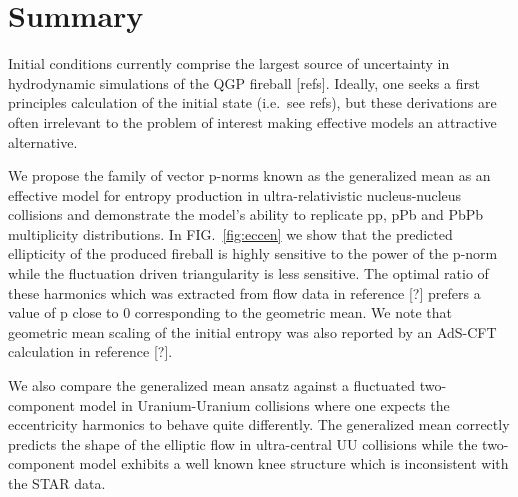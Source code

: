 \documentclass[aps,prl,reprint,amsmath,nofootinbib]{revtex4-1}
\begin{document}
\section{Summary}

Initial conditions currently comprise the largest source of uncertainty in hydrodynamic simulations of the QGP
fireball [refs]. Ideally, one seeks a first principles calculation of the initial state (i.e.\ see refs), but
these derivations are often irrelevant to the problem of interest making effective models an attractive
alternative.

We propose the family of vector p-norms known as the generalized mean as an effective model for entropy
production in ultra-relativistic nucleus-nucleus collisions and demonstrate the model's ability to
replicate pp, pPb and PbPb multiplicity distributions. In FIG.~\ref{fig:eccen} we show that the predicted
ellipticity of the produced fireball is highly sensitive to the power of the p-norm while the fluctuation
driven triangularity is less sensitive. The optimal ratio of these harmonics which was extracted from flow
data in reference [?] prefers a value of p close to 0 corresponding to the geometric mean. We note that
geometric mean scaling of the initial entropy was also reported by an AdS-CFT calculation in reference [?].

We also compare the generalized mean ansatz against a fluctuated two-component model in Uranium-Uranium
collisions where one expects the eccentricity harmonics to behave quite differently. The generalized mean
correctly predicts the shape of the elliptic flow in ultra-central UU collisions while the two-component model
exhibits a well known knee structure which is inconsistent with the STAR data.



\end{document}
